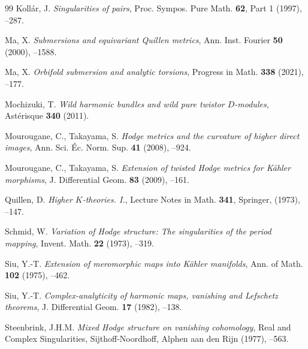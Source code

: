 \documentclass[amscd, leqno]{amsart}
\theoremstyle{plain}
\theoremstyle{definition}
\theoremstyle{remark}
\begin{document}
\begin{thebibliography}{99}
Koll\'ar, J.
\newblock
\textit{Singularities of pairs},
\newblock 
Proc. Sympos. Pure Math.
\newblock
{\bf 62},
\newblock
Part 1
\newblock 
(1997),
--287.


Ma, X.
\newblock 
\textit{Submersions and equivariant Quillen metrics},
\newblock 
Ann. Inst. Fourier
\newblock 
{\bf 50}
\newblock 
(2000),
--1588.


Ma, X.
\newblock
\textit{Orbifold submersion and analytic torsions},
\newblock
Progress in Math.
\newblock
{\bf 338}
\newblock
(2021),
--177.


Mochizuki, T.
\newblock
\textit{Wild harmonic bundles and wild pure twistor $D$-modules},
Ast\'erisque
\newblock
{\bf 340}
\newblock
(2011).


Mourougane, C., Takayama, S.
\newblock
\textit{Hodge metrics and the curvature of higher direct images},
\newblock
Ann. Sci. \'Ec. Norm. Sup.
\newblock
{\bf 41}
\newblock
(2008),
--924.


Mourougane, C., Takayama, S.
\newblock
\textit{Extension of twisted Hodge metrics for K\"ahler morphisms},
\newblock
J. Differential Geom.
\newblock
{\bf 83}
\newblock
(2009),
--161.


Quillen, D.
\newblock
\textit{Higher $K$-theories. I.},
\newblock
Lecture Notes in Math.
\newblock
{\bf 341},
\newblock
Springer,
\newblock
(1973),
--147.


Schmid, W.
\newblock 
\textit{Variation of Hodge structure: The singularities of the period mapping},
\newblock 
Invent. Math.
\newblock 
{\bf 22}
\newblock 
(1973),
--319.


Siu, Y.-T.
\newblock
\textit{Extension of meromorphic maps into K\"ahler manifolds},
\newblock
Ann. of Math.
\newblock
{\bf 102}
\newblock
(1975),
--462.


Siu, Y.-T.
\newblock
\textit{Complex-analyticity of harmonic maps, vanishing and Lefschetz theorems},
\newblock
J. Differential Geom.
\newblock
{\bf 17}
\newblock
(1982),
--138.


Steenbrink, J.H.M.
\newblock 
\textit{Mixed Hodge structure on vanishing cohomology},
\newblock 
Real and Complex Singularities,
\newblock 
Sijthoff-Noordhoff, Alphen aan den Rijn
\newblock 
(1977),
--563.



\end{thebibliography}
\end{document}
